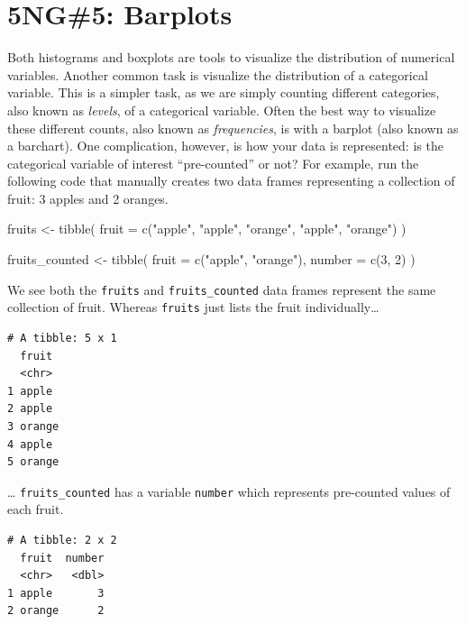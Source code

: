 \documentclass[
  letterpaper,
  DIV=11,
  numbers=noendperiod]{scrreprt}
\newenvironment{Shaded}{\begin{snugshade}}{\end{snugshade}}
\newcommand{\AttributeTok}[1]{\textcolor[rgb]{0.40,0.45,0.13}{#1}}
\newcommand{\DecValTok}[1]{\textcolor[rgb]{0.68,0.00,0.00}{#1}}
\newcommand{\FunctionTok}[1]{\textcolor[rgb]{0.28,0.35,0.67}{#1}}
\newcommand{\NormalTok}[1]{\textcolor[rgb]{0.00,0.23,0.31}{#1}}
\newcommand{\OtherTok}[1]{\textcolor[rgb]{0.00,0.23,0.31}{#1}}
\newcommand{\StringTok}[1]{\textcolor[rgb]{0.13,0.47,0.30}{#1}}
\theoremstyle{definition}
\theoremstyle{remark}
\begin{document}
\hypertarget{sec-geombar}{%
\section{5NG\#5: Barplots}\label{sec-geombar}}

Both histograms and boxplots are tools to visualize the distribution of
numerical variables. Another common task is visualize the distribution
of a categorical variable. This is a simpler task, as we are simply
counting different categories, also known as \emph{levels}, of a
categorical variable. Often the best way to visualize these different
counts, also known as \emph{frequencies}, is with a barplot (also known
as a barchart). One complication, however, is how your data is
represented: is the categorical variable of interest ``pre-counted'' or
not? For example, run the following code that manually creates two data
frames representing a collection of fruit: 3 apples and 2 oranges.

\begin{Shaded}
\begin{Highlighting}[]
\NormalTok{fruits }\OtherTok{\textless{}{-}} \FunctionTok{tibble}\NormalTok{(}
  \AttributeTok{fruit =} \FunctionTok{c}\NormalTok{(}\StringTok{"apple"}\NormalTok{, }\StringTok{"apple"}\NormalTok{, }\StringTok{"orange"}\NormalTok{, }\StringTok{"apple"}\NormalTok{, }\StringTok{"orange"}\NormalTok{)}
\NormalTok{  )}

\NormalTok{fruits\_counted }\OtherTok{\textless{}{-}} \FunctionTok{tibble}\NormalTok{(}
  \AttributeTok{fruit =} \FunctionTok{c}\NormalTok{(}\StringTok{"apple"}\NormalTok{, }\StringTok{"orange"}\NormalTok{),}
  \AttributeTok{number =} \FunctionTok{c}\NormalTok{(}\DecValTok{3}\NormalTok{, }\DecValTok{2}\NormalTok{)}
\NormalTok{  )}
\end{Highlighting}
\end{Shaded}

We see both the \texttt{fruits} and \texttt{fruits\_counted} data frames
represent the same collection of fruit. Whereas \texttt{fruits} just
lists the fruit individually\ldots{}

\begin{verbatim}
# A tibble: 5 x 1
  fruit 
  <chr> 
1 apple 
2 apple 
3 orange
4 apple 
5 orange
\end{verbatim}

\ldots{} \texttt{fruits\_counted} has a variable \texttt{number} which
represents pre-counted values of each fruit.

\begin{verbatim}
# A tibble: 2 x 2
  fruit  number
  <chr>   <dbl>
1 apple       3
2 orange      2
\end{verbatim}
\end{document}
